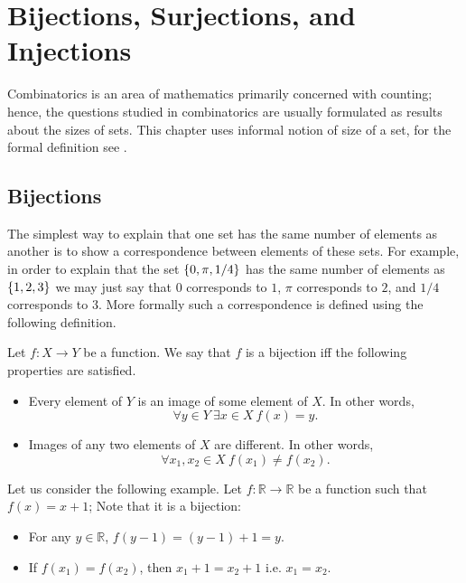 \chapter{Bijections, Surjections, and Injections}
\label{chapter:bijections-surjections-injections}

Combinatorics is an area of mathematics primarily concerned with counting;
hence, the questions studied in combinatorics are usually formulated as results
about the sizes of sets. This chapter uses informal notion of size of a set, for
the formal definition see .
\section{Bijections}
The simplest way to explain that one set has the same number of elements as
another is to show a correspondence between elements of these sets. For example,
in order to explain that the set $\set{0, \pi, 1 / 4}$ has the same number of
elements as $\set{1, 2, 3}$ we may just say that $0$ corresponds to $1$,
$\pi$ corresponds to $2$, and $1 / 4$ corresponds to $3$. More formally such a
correspondence is defined using the following definition.
\begin{definition}
    Let $f : X \to Y$ be a function. We say that $f$ is a bijection iff the
    following properties are satisfied.
    \begin{itemize}
        \item Every element of $Y$ is an image of some element of $X$. In other
            words,
            \[
                \forall y \in Y~\exists x \in X\ f(x) = y.
            \]
        \item Images of any two elements
            of $X$ are different. In other words,
            \[
                \forall x_1, x_2 \in X\ f(x_1) \neq f(x_2).
            \]
    \end{itemize}
\end{definition}

Let us consider the following example. Let $f : \mathbb{R} \to \mathbb{R}$ be a
function such that $f(x) = x + 1$; Note that it is a bijection:
\begin{itemize}
    \item For any $y \in \mathbb{R}$, $f(y - 1) = (y - 1) + 1 = y$.
    \item If $f(x_1) = f(x_2)$, then $x_1 + 1 = x_2 + 1$ i.e. $x_1 = x_2$.
\end{itemize}

